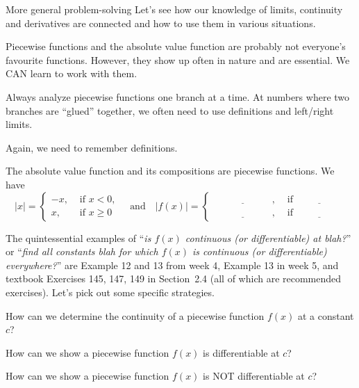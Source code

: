 \documentclass[../main.tex]{subfiles}
\begin{document}
\begin{lesson}{More general problem-solving}
  Let's see how our knowledge of limits, continuity and derivatives are connected and how to use them in various situations.

  \clearpage

  Piecewise functions and the absolute value function are probably not everyone's favourite functions. However, they show up often in nature and are essential. We CAN learn to work with them.

  \begin{mdframed}[style=simple-compact]
    Always analyze piecewise functions one branch at a time. At numbers where two branches are ``glued'' together, we often need to use definitions and left/right limits.

    Again, we need to remember definitions.
  \end{mdframed}

  The absolute value function and its compositions are piecewise functions. We have
  \[
    |x| = 
    \begin{cases}
      -x, &\text{ if } x < 0, \\
      x, &\text{ if } x \ge 0
    \end{cases}
    \quad \text{and} \quad 
    |f(x)| = 
    \begin{cases}
      \underline{\hspace{1in}}, &\text{ if } \underline{\hspace{2cm}} \\
      \underline{\hspace{1in}}, &\text{ if } \underline{\hspace{2cm}}
    \end{cases}
  \]

  The quintessential examples of ``\emph{is \(f(x)\) continuous (or differentiable) at blah?}'' or ``\emph{find all constants blah for which \(f(x)\) is continuous (or differentiable) everywhere?}'' are Example 12 and 13 from week 4, Example 13 in week 5, and textbook Exercises 145, 147, 149 in Section~2.4 (all of which are recommended exercises). Let's pick out some specific strategies.

  \faComment{} How can we determine the continuity of a piecewise function \(f(x)\) at a constant \(c\)?

  \faComment{} How can we show a piecewise function \(f(x)\) is differentiable at \(c\)?

  \faComment{} How can we show a piecewise function \(f(x)\) is NOT differentiable at \(c\)?


\end{lesson}
\end{document}

